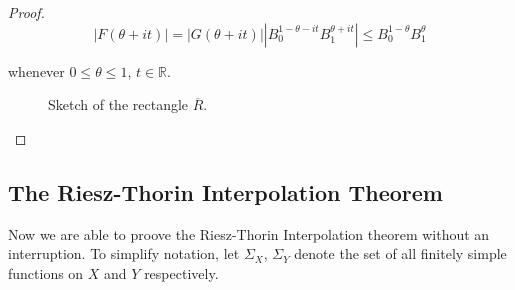 \begin{proof}
\begin{equation*}
	\left| F(\theta + it) \right| = \left| G(\theta + it) \right| \left| B_0^{1 - \theta - it}B_1^{\theta + it}\right| \leqslant B_0^{1 - \theta} B_1^{\theta}
\end{equation*}

whenever $0 \leqslant \theta \leqslant 1$, $t \in \mathbb{R}$.

\begin{figure}[h!tb]
	\centering
	\caption[Hadamard's three lines lemma: sketch of the rectangle $\overline{R}$]{Sketch of the rectangle $\overline{R}$.}
	\label{fig:Hadamards_three_lines_lemma}
\end{figure}
\end{proof}

\subsection{The Riesz-Thorin Interpolation Theorem}
Now we are able to proove the Riesz-Thorin Interpolation theorem without an interruption. To simplify notation, let $\Sigma_X$, $\Sigma_Y$ denote the set of all finitely simple functions on $X$ and $Y$ respectively.

\vspace{2mm}

